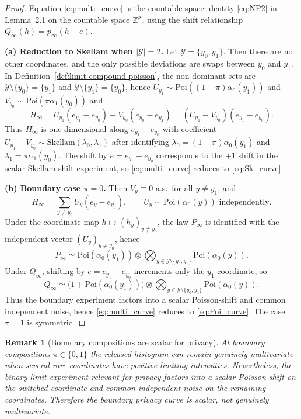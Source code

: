 \documentclass{article}
\newtheorem{remark}[theorem]{Remark}
\begin{document}
\begin{proof}
Equation \eqref{eq:multi_curve} is the countable-space identity \eqref{eq:NP2} in Lemma~2.1 on the countable space $\mathbb{Z}^{\mathcal{Y}}$, using the
shift relationship $Q_\infty(h) = p_\infty(h - e)$.

\textbf{(a) Reduction to Skellam when $|\mathcal{Y}| = 2$.} Let $\mathcal{Y} = \{y_0, y_1\}$. Then there are no other coordinates, and
the only possible deviations are swaps between $y_0$ and $y_1$. In Definition~\ref{def:limit-compound-poisson}, the non-dominant sets are
$\mathcal{Y}\setminus\{y_0\} = \{y_1\}$ and $\mathcal{Y}\setminus\{y_1\} = \{y_0\}$, hence $U_{y_1} \sim \mathrm{Poi}((1-\pi)\alpha_0(y_1))$ and $V_{y_0} \sim \mathrm{Poi}(\pi\alpha_1(y_0))$ and
\[
H_\infty = U_{y_1}(e_{y_1} - e_{y_0}) + V_{y_0}(e_{y_0} - e_{y_1}) = (U_{y_1} - V_{y_0})(e_{y_1} - e_{y_0}).
\]
Thus $H_\infty$ is one-dimensional along $e_{y_1} - e_{y_0}$ with coefficient $U_{y_1} - V_{y_0} \sim \mathrm{Skellam}(\lambda_0, \lambda_1)$ after identifying
$\lambda_0 = (1-\pi)\alpha_0(y_1)$ and $\lambda_1 = \pi\alpha_1(y_0)$. The shift by $e = e_{y_1} - e_{y_0}$ corresponds to the $+1$ shift in the scalar
Skellam-shift experiment, so \eqref{eq:multi_curve} reduces to \eqref{eq:Sk_curve}.

\textbf{(b) Boundary case $\pi = 0$.} Then $V_y \equiv 0$ a.s.\ for all $y \neq y_1$, and
\[
H_\infty = \sum_{y \neq y_0} U_y(e_y - e_{y_0}), \qquad U_y \sim \mathrm{Poi}(\alpha_0(y)) \text{ independently.}
\]
Under the coordinate map $h \mapsto (h_y)_{y \neq y_0}$, the law $P_\infty$ is identified with the independent vector $(U_y)_{y \neq y_0}$,
hence
\[
P_\infty \simeq \mathrm{Poi}(\alpha_0(y_1)) \otimes \bigotimes_{y \in \mathcal{Y}\setminus\{y_0,y_1\}} \mathrm{Poi}(\alpha_0(y)).
\]
Under $Q_\infty$, shifting by $e = e_{y_1} - e_{y_0}$ increments only the $y_1$-coordinate, so
\[
Q_\infty \simeq \bigl(1 + \mathrm{Poi}(\alpha_0(y_1))\bigr) \otimes \bigotimes_{y \in \mathcal{Y}\setminus\{y_0,y_1\}} \mathrm{Poi}(\alpha_0(y)).
\]
Thus the boundary experiment factors into a scalar Poisson-shift and common independent noise, hence \eqref{eq:multi_curve}
reduces to \eqref{eq:Poi_curve}. The case $\pi = 1$ is symmetric.
\end{proof}

\begin{remark}[Boundary compositions are scalar for privacy]
\label{rem:boundary-scalar-privacy}
At boundary compositions $\pi \in \{0,1\}$ the released histogram can remain genuinely multivariate when several rare coordinates have positive limiting
intensities. Nevertheless, the binary limit experiment relevant for privacy factors into a scalar Poisson-shift
on the switched coordinate and common independent noise on the remaining coordinates. Therefore the
boundary privacy curve is scalar, not genuinely multivariate.
\end{remark}
\end{document}
